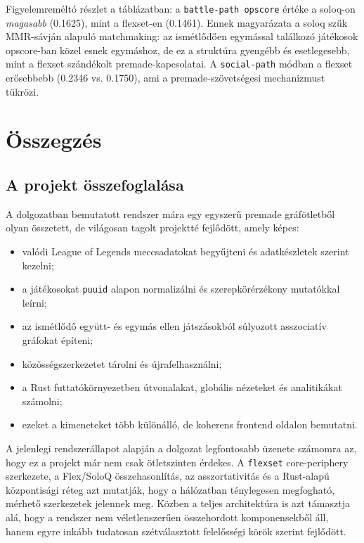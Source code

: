 ﻿\documentclass[a4paper,12pt]{report}
\begin{document}
Figyelemreméltó részlet a táblázatban: a \texttt{battle-path opscore} értéke a soloq-on \emph{magasabb} (0.1625), mint a flexset-en (0.1461). Ennek magyarázata a soloq szűk MMR-sávján alapuló matchmaking: az ismétlődően egymással találkozó játékosok opscore-ban közel esnek egymáshoz, de ez a struktúra gyengébb és esetlegesebb, mint a flexset szándékolt premade-kapcsolatai. A \texttt{social-path} módban a flexset erősebbebb (0.2346 vs. 0.1750), ami a premade-szövetségesi mechanizmust tükrözi.

\chapter{Összegzés}

\section{A projekt összefoglalása}

A dolgozatban bemutatott rendszer mára egy egyszerű premade gráfötletből olyan összetett, de világosan tagolt projektté fejlődött, amely képes:

\begin{itemize}
    \item valódi League of Legends meccsadatokat begyűjteni és adatkészletek szerint kezelni;
    \item a játékosokat \texttt{puuid} alapon normalizálni és szerepkörérzékeny mutatókkal leírni;
    \item az ismétlődő együtt- és egymás ellen játszásokból súlyozott asszociatív gráfokat építeni;
    \item közösségszerkezetet tárolni és újrafelhasználni;
    \item a Rust futtatókörnyezetben útvonalakat, globális nézeteket és analitikákat számolni;
    \item ezeket a kimeneteket több különálló, de koherens frontend oldalon bemutatni.
\end{itemize}

A jelenlegi rendszerállapot alapján a dolgozat legfontosabb üzenete számomra az, hogy ez a projekt már nem csak ötletszinten érdekes. A \texttt{flexset} core-periphery szerkezete, a Flex/SoloQ összehasonlítás, az asszortativitás és a Rust-alapú központisági réteg azt mutatják, hogy a hálózatban ténylegesen megfogható, mérhető szerkezetek jelennek meg. Közben a teljes architektúra is azt támasztja alá, hogy a rendszer nem véletlenszerűen összehordott komponensekből áll, hanem egyre inkább tudatosan szétválasztott felelősségi körök szerint fejlődött.
\end{document}
